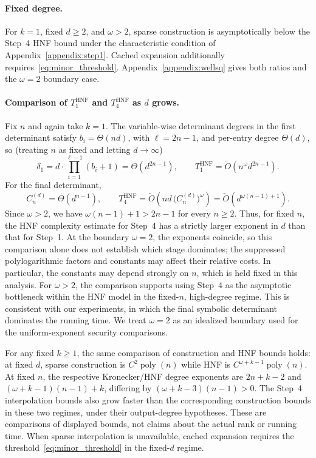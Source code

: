 \paragraph{Fixed degree.}
For $k=1$, fixed $d\ge2$, and $\omega>2$, sparse construction is asymptotically below the Step~4 HNF bound under the characteristic condition of Appendix~\ref{appendix:step1}. Cached expansion additionally requires~\eqref{eq:minor_threshold}. Appendix~\ref{appendix:wellsq} gives both ratios and the $\omega=2$ boundary case.

\paragraph{Comparison of $T_{1}^{\mathrm{HNF}}$ and $T_{4}^{\mathrm{HNF}}$ as $d$ grows.}
Fix $n$ and again take $k=1$. The variable-wise determinant degrees in the first determinant satisfy $b_i=\Theta(nd)$, with $\ell=2n-1$, and per-entry degree $\Theta(d)$, so (treating $n$ as fixed and letting $d\to\infty$)
\[
\delta_1 = d\cdot \prod_{i=1}^{\ell-1}(b_i+1) =\Theta(d^{2n-1}),
\qquad
T_{1}^{\mathrm{HNF}}=\widetilde{O}(n^\omega d^{2n-1}).
\]
For the final determinant,
\[
C_n^{(d)}=\Theta(d^{n-1}),
\qquad
T_{4}^{\mathrm{HNF}}=\widetilde{O}\!\left(nd\,\bigl(C_n^{(d)}\bigr)^\omega\right)=\widetilde{O}(d^{\omega(n-1)+1}).
\]
Since $\omega>2$, we have $\omega(n-1)+1>2n-1$ for every $n\ge 2$. Thus, for fixed $n$, the HNF complexity estimate for Step~4 has a strictly larger exponent in $d$ than that for Step~1. At the boundary $\omega=2$, the exponents coincide, so this comparison alone does not establish which stage dominates; the suppressed polylogarithmic factors and constants may affect their relative costs. In particular, the constants may depend strongly on $n$, which is held fixed in this analysis. For $\omega>2$, the comparison supports using Step~4 as the asymptotic bottleneck within the HNF model in the fixed-$n$, high-degree regime. This is consistent with our experiments, in which the final symbolic determinant dominates the running time. We treat $\omega=2$ as an idealized boundary used for the uniform-exponent security comparisons.

For any fixed $k\ge1$, the same comparison of construction and HNF bounds holds: at fixed $d$, sparse construction is $C^2\operatorname{poly}(n)$ while HNF is $C^{\omega+k-1}\operatorname{poly}(n)$. At fixed $n$, the respective Kronecker/HNF degree exponents are $2n+k-2$ and $(\omega+k-1)(n-1)+k$, differing by $(\omega+k-3)(n-1)>0$. The Step~4 interpolation bounds also grow faster than the corresponding construction bounds in these two regimes, under their output-degree hypotheses. These are comparisons of displayed bounds, not claims about the actual rank or running time. When sparse interpolation is unavailable, cached expansion requires the threshold~\eqref{eq:minor_threshold} in the fixed-$d$ regime.

